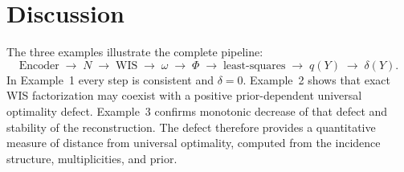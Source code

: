 \section{Discussion}
The three examples illustrate the complete pipeline:
\[
\text{Encoder}\;\to\; N \;\to\; \text{WIS}
\;\to\; \omega \;\to\; \Phi
\;\to\; \text{least-squares}
\;\to\; q(Y) \;\to\; \delta(Y).
\]
In Example~1 every step is consistent and $\delta=0$.  Example~2 shows
that exact WIS factorization may coexist with a positive
prior-dependent universal optimality defect.  Example~3 confirms
monotonic decrease of that defect and stability of the reconstruction.
The defect therefore provides a quantitative measure of distance from
universal optimality, computed from the incidence structure,
multiplicities, and prior.
\endinput
